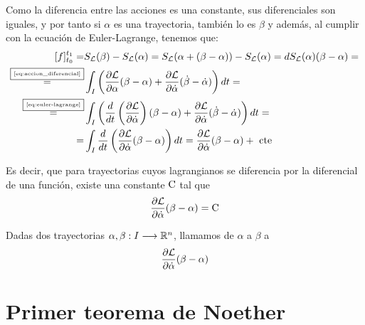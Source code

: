 Como la diferencia entre las acciones es una constante, sus diferenciales son iguales, y por tanto si $\alpha$ es una trayectoria, también lo es $\beta$ y además, al cumplir con la ecuación de Euler-Lagrange, tenemos que:
\begin{equation}
	\label{eq:diferencial_trayectoria}
	\begin{split}
	[f]
		_{t_0}^{t_1} = & S_{\mathcal{L}}(\beta) - S_{\mathcal{L}}(\alpha) = S_{\mathcal{L}}(\alpha + (\beta-\alpha))-S_{\mathcal{L}}(\alpha)=dS_{\mathcal{L}}(\alpha)(\beta-\alpha)=\\
		\overset{\fbox{\tiny \ref{eq:accion_diferencial}}}{=} & \int_{I}\left( \frac{\partial \mathcal{L}}{\partial\alpha}(\beta-\alpha)+\frac{\partial \mathcal{L}}{\partial\dot{\alpha}}(\dot{\beta}-\dot{\alpha})\right) dt = \\
		\overset{\fbox{\tiny \ref{eq:euler-lagrange}}}{=} & \int_{I}\left( \frac{d}{dt}\left(\frac{\partial \mathcal{L}}{\partial\dot{\alpha}}\right)(\beta-\alpha)+\frac{\partial \mathcal{L}}{\partial\dot{\alpha}}(\dot{\beta}-\dot{\alpha})\right) dt=\\
		= & \int_{I}\frac{d}{dt}\left(\frac{\partial \mathcal{L}}{\partial\dot{\alpha}}(\beta-\alpha)\right) dt = \frac{\partial \mathcal{L}}{\partial\dot{\alpha}}(\beta-\alpha) + \text{ cte }
	\end{split}
\end{equation}

Es decir, que para trayectorias cuyos lagrangianos se diferencia por la diferencial de una función, existe una constante $\text{\rmfamily\upshape C}$ tal que
\begin{equation}
	\label{eq:carga_noether_para_trayectorias}
	\frac{\partial \mathcal{L}}{\partial\dot{\alpha}}(\beta-\alpha) = \text{\rmfamily\upshape C}
\end{equation}

\begin{definition}
	Dadas dos trayectorias $\alpha,\beta:I\longrightarrow \mathbb{R}^n$, llamamos  de $\alpha$ a $\beta$ a
	\begin{equation}
		\label{eq:carga_noether}
		\frac{\partial \mathcal{L}}{\partial\dot{\alpha}}(\beta-\alpha)
	\end{equation}
\end{definition}

\section{Primer teorema de Noether}\label{sec:primer-teorema-de-noether}

